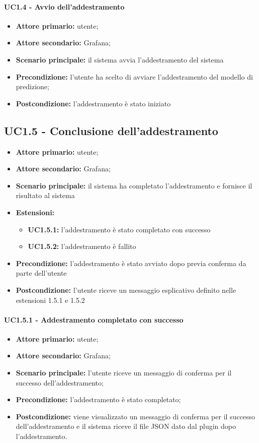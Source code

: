 \documentclass{article}
\begin{document}
	\paragraph{UC1.4 - Avvio dell'addestramento}
	\begin{itemize}
		\item \textbf{Attore primario:} utente;
		\item \textbf{Attore secondario:} Grafana;
		\item \textbf{Scenario principale:} il sistema avvia l'addestramento del sistema 
		\item \textbf{Precondizione:} l'utente ha scelto di avviare l'addestramento del modello di predizione;
		\item \textbf{Postcondizione:} l'addestramento è stato iniziato
	\end{itemize}

	\subsection{UC1.5 - Conclusione dell'addestramento}
	\begin{itemize}
		\item \textbf{Attore primario:} utente;
		\item \textbf{Attore secondario:} Grafana;
		\item \textbf{Scenario principale:} il sistema ha completato l'addestramento e fornisce il risultato al sistema
		\item \textbf{Estensioni:}
			\begin{itemize}
				\item \textbf{UC1.5.1:} l'addestramento è stato completato con successo
				\item \textbf{UC1.5.2:} l'addestramento è fallito 
			\end{itemize}
		\item \textbf{Precondizione:} l'addestramento è stato avviato dopo previa conferma da parte dell'utente
		\item \textbf{Postcondizione:} l'utente riceve un messaggio esplicativo definito nelle estensioni 1.5.1 e 1.5.2
	\end{itemize}
	
	\paragraph{UC1.5.1 - Addestramento completato con successo}
	\begin{itemize}
		\item \textbf{Attore primario:} utente;
		\item \textbf{Attore secondario:} Grafana;
		\item \textbf{Scenario principale:} l'utente riceve un messaggio di conferma per il successo dell'addestramento;
		\item \textbf{Precondizione:} l'addestramento è stato completato;
		\item \textbf{Postcondizione:} viene visualizzato un messaggio di conferma per il successo dell'addestramento e il sistema riceve il file JSON dato dal plugin dopo l'addestramento.
	\end{itemize}
\end{document}

